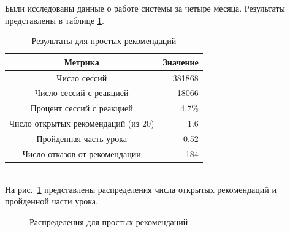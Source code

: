\documentclass[12pt]{article}
\begin{document}
\indent Были исследованы данные о работе системы за четыре месяца. Результаты представлены в таблице \ref{tabular:table_usual}.

\begin{table}[h]
    \caption{Результаты для простых рекомендаций}
    \label{tabular:table_usual}
    
    \begin{center}
    \begin{tabular}{ c | r }
      \hline
      Метрика & Значение \\
      \hline	
      \hline
      Число сессий & 381868 \\
      Число сессий с реакцией & 18066 \\
      Процент сессий с реакцией &  4.7\% \\
      Число открытых рекомендаций (из 20) & 1.6 \\
      Пройденная часть урока & 0.52 \\
      Число отказов от рекомендации & 184 \\\hline
    \end{tabular}
    \end{center}
\end{table}

\\\indent На рис.~\ref{fig:usual_distibutions} представлены распределения числа открытых рекомендаций и пройденной части урока.

\begin{figure}[h]
  \centering
  \hfill
    \caption{Распределения для простых рекомендаций}
    \label{fig:usual_distibutions}
\end{figure}
\end{document}

